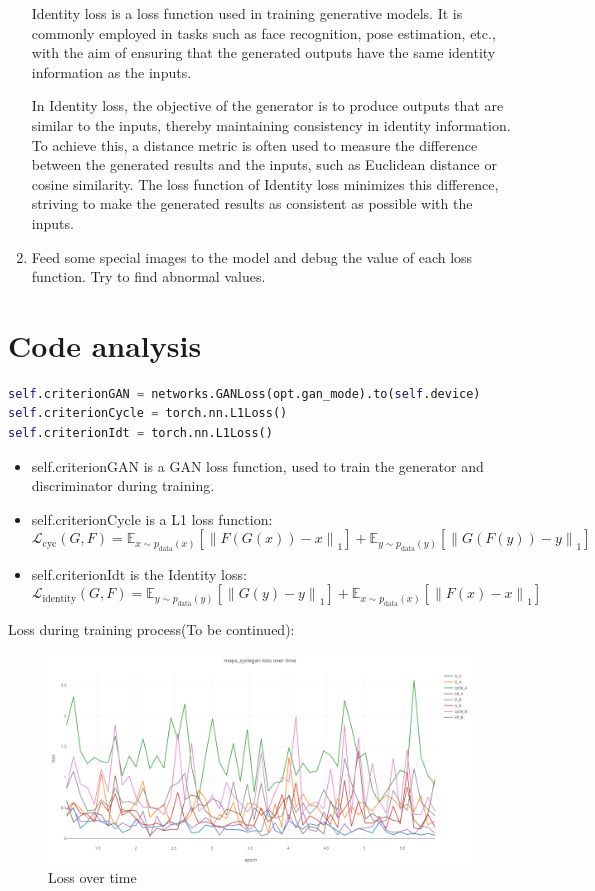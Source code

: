 \documentclass[
]{article}
\begin{document}
\begin{enumerate}
Identity loss is a loss function used in training generative models. It is commonly employed in tasks such as face recognition, pose estimation, etc., with the aim of ensuring that the generated outputs have the same identity information as the inputs.

In Identity loss, the objective of the generator is to produce outputs that are similar to the inputs, thereby maintaining consistency in identity information. To achieve this, a distance metric is often used to measure the difference between the generated results and the inputs, such as Euclidean distance or cosine similarity. The loss function of Identity loss minimizes this difference, striving to make the generated results as consistent as possible with the inputs.

\item
  Feed some special images to the model and debug the value of each loss
  function. Try to find abnormal values.
\end{enumerate}

\hypertarget{code-analysis}{%
\section{Code analysis}\label{code-analysis}}

\begin{lstlisting}[language=Python]
self.criterionGAN = networks.GANLoss(opt.gan_mode).to(self.device)
self.criterionCycle = torch.nn.L1Loss()
self.criterionIdt = torch.nn.L1Loss()
\end{lstlisting}

\begin{itemize}
  \item self.criterionGAN is a GAN loss function, used to train the generator and discriminator during training.
  
  \item self.criterionCycle is a L1 loss function:\[\mathcal{L}_{\text{cyc}}(G,F)=\mathbb{E}_{x\sim p_{\text{data}}(x)}[\left\|F(G(x))-x\right\|_1]+\mathbb{E}_{y\sim p_{\text{data}}(y)}[\left\|G(F(y))-y\right\|_1]\]
  
  \item self.criterionIdt is the Identity loss:\[\mathcal{L}_{\text{identity}}(G,F)=\mathbb{E}_{y\sim p_{\text{data}}(y)}[\left\|G(y)-y\right\|_1]+\mathbb{E}_{x\sim p_{\text{data}}(x)}[\left\|F(x)-x\right\|_1]\]
  
\end{itemize}

Loss during training process(To be continued):
\begin{figure}
\centering
\includegraphics{./assets/Loss_over_time.png}
\caption{Loss over time}
\end{figure}
\end{document}
